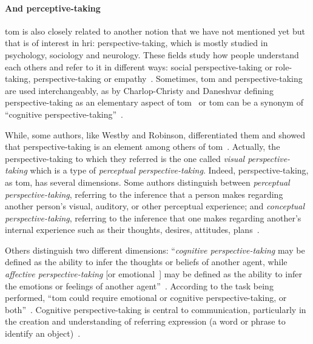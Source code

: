 \documentclass[a4paper,11pt,twoside]{StyleThese}
\begin{document}
\paragraph{And perceptive-taking} \acrshort{tom} is also closely related to another notion that we have not mentioned yet but that is of interest in \acrshort{hri}: perspective-taking, which is mostly studied in psychology, sociology and neurology. These fields study how people understand each others and refer to it in different ways: social perspective-taking or role-taking, perspective-taking or empathy~\cite{davis_2017_self,quesque_2020_theory}. Sometimes, \acrshort{tom} and perspective-taking are used interchangeably, as by Charlop-Christy and Daneshvar defining perspective-taking as an elementary aspect of \acrshort{tom}~\cite{charlop_2003_using} or \acrshort{tom} can be a synonym of ``cognitive perspective-taking''~\cite{barnes_2004_perspective}. 

While, some authors, like Westby and Robinson, differentiated them and showed that perspective-taking is an element among others of \acrshort{tom}~\cite{westby_2014_developmental}. Actually, the perspective-taking to which they referred is the one called \emph{visual perspective-taking} which is a type of \emph{perceptual perspective-taking}. Indeed, perspective-taking, as \acrshort{tom}, has several dimensions. Some authors distinguish between \emph{perceptual perspective-taking}, referring to the inference that a person makes regarding another person's visual, auditory, or other perceptual experience; and \emph{conceptual perspective-taking}, referring to the inference that one makes regarding another's internal experience such as their thoughts, desires, attitudes, plans~\cite{marvin_1976_early}. 

Others distinguish two different dimensions: ``\emph{cognitive perspective-taking} may be defined as the ability to infer the thoughts or beliefs of another agent, while \emph{affective perspective-taking} [or emotional~\cite{hynes_2006_differential}] may be defined as the ability to infer the emotions or feelings of another agent''~\cite{healey_2018_cognitive}. According to the task being performed, ``\acrlong{tom} could require emotional or cognitive perspective-taking, or both''~\cite[p.~375]{hynes_2006_differential}. Cognitive perspective-taking is central to communication, particularly in the creation and understanding of referring expression (\ie a word or phrase to identify an object)~\cite{krauss_1991_perspective}.

\bigskip
\end{document}
